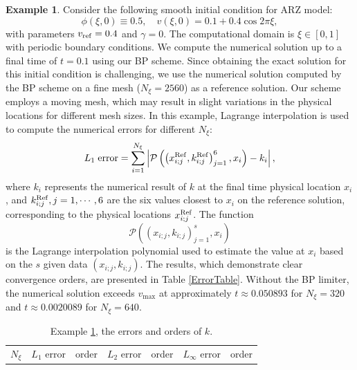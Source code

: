 \documentclass[times,final,11pt]{elsarticle}
\numberwithin{equation}{section}
\theoremstyle{definition}
\newtheorem{exa}[remark]{Example}
\theoremstyle{remark}
\begin{document}
\begin{exa} \label{exam1}
	Consider the following smooth initial condition for ARZ model:
	\begin{equation*}
		\phi(\xi, 0) \equiv 0.5, \quad v(\xi, 0) = 0.1 + 0.4 \cos{2 \pi \xi},
	\end{equation*}
	with parameters $v_{\rm ref} = 0.4$ and $\gamma = 0$. The computational domain is $\xi \in [0, 1]$ with periodic boundary conditions. We compute the numerical solution up to a final time of $t = 0.1$ using our BP scheme. Since obtaining the exact solution for this initial condition is challenging, we use the numerical solution computed by the BP scheme on a fine mesh ($N_\xi = 2560$) as a reference solution. Our scheme employs a moving mesh, which may result in slight variations in the physical locations for different mesh sizes. In this example, Lagrange interpolation is used to compute the numerical errors for different $N_\xi$: 
	\begin{equation*}
		L_1 \; {\rm error} = \sum_{i = 1}^{N_\xi} \left\vert \mathcal{P} \left( \left(x_{i;j}^{\rm Ref}, k_{i;j}^{\rm Ref}\right)_{j = 1}^6, x_i\right) - k_i \right\vert,
	\end{equation*}
	where $k_i$ represents the numerical result of $k$ at the final time physical location $x_i$, and $k_{i;j}^{\rm Ref}, j = 1, \cdots, 6$ are the six values closest to $x_i$ on the reference solution, corresponding to the physical locations $x_{i;j}^{\rm Ref}$. The function 
	\begin{equation*}
		\mathcal{P} \left( \left(x_{i;j}, k_{i;j}\right)_{j = 1}^s, x_i\right)
	\end{equation*}
	 is the Lagrange interpolation polynomial used to estimate the value at $x_i$ based on the $s$ given data $(x_{i;j}, k_{i;j})$. The results, which demonstrate clear convergence orders, are presented in Table \ref{ErrorTable}. Without the BP limiter, the numerical solution exceeds $v_{\max}$ at approximately $t \approx 0.050893$ for $N_\xi = 320$ and $t \approx 0.0020089$ for $N_\xi = 640$.

	\begin{table}[th!]
		\renewcommand\arraystretch{1.2}
		\caption{\sf Example \ref{exam1}, the errors and orders of $k$.}
		\begin{center}
			\begin{tabular}{clclclc}
				
				\toprule[1.5pt]
				
				$N_\xi$ &$L_1$ error & order & $L_2$ error & order & $L_\infty$ error & order \\ 
				

\end{tabular}
\end{center}
\end{table}
\end{exa}
\end{document}
